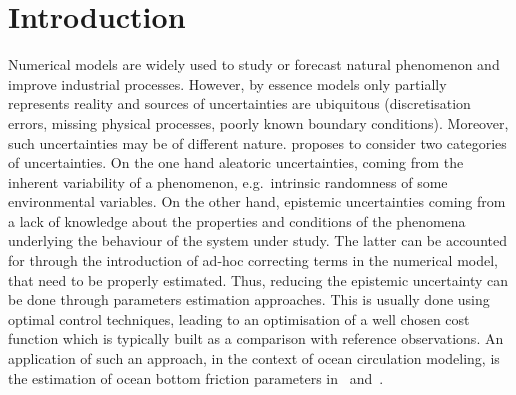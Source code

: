 \documentclass[preprint, 1p]{elsarticle}
\newcommand{\arthur}[1]{{\itshape\color{cyan} ({#1})}}
\newcommand{\victor}[1]{{\itshape\color{green} ({#1})}}
\begin{document}

\section*{Introduction}
\label{}



Numerical models are widely used to study or forecast natural phenomenon and improve industrial processes. However, by essence models only partially represents reality and sources of uncertainties are ubiquitous (discretisation errors, missing physical processes, poorly known boundary conditions).
%
Moreover, such uncertainties may be of different nature. 
\cite{walker_defining_2003} proposes to consider two categories of uncertainties. On the one hand aleatoric uncertainties,  coming from the inherent variability of a phenomenon, e.g.\ intrinsic randomness of some environmental variables. On the other hand, epistemic uncertainties coming from a lack of knowledge about the properties and conditions of the phenomena underlying the behaviour of the system under study.
The latter can be accounted for through the introduction of ad-hoc correcting terms in the numerical model, that need to be properly estimated. Thus, reducing the epistemic uncertainty can be done through parameters estimation approaches. 
This is usually done using optimal control techniques, leading to an optimisation of a well chosen cost function which is typically built as a comparison with reference observations.
%
An application of such an approach, in the context of ocean circulation modeling, is the estimation of ocean bottom friction parameters in~\cite{das_estimation_1991} and~\cite{boutet_estimation_2015}. 
\end{document}
